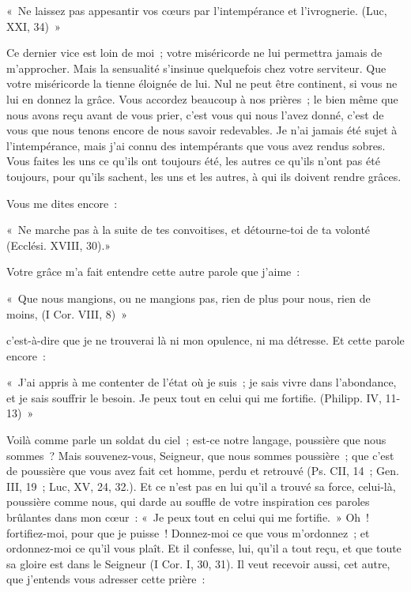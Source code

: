 \documentclass[french,twoside]{book} %
\newenvironment{quoteblock}%
  {\begin{quoting}}
  {\end{quoting}}
\newenvironment{quotebar}{%
    \def\FrameCommand{{\color{rubric!10!}\vrule width 0.5em} \hspace{0.9em}}%
    \def\OuterFrameSep{\itemsep} %
    \MakeFramed {\advance\hsize-\width \FrameRestore}
  }%
  {%
    \endMakeFramed
  }
\renewenvironment{quoteblock}%
  {%
    \savenotes
    \setstretch{0.9}
    \normalfont
    \begin{quotebar}
  }
  {%
    \end{quotebar}
    \spewnotes
  }
\begin{document}
\begin{quoteblock}
\noindent « Ne laissez pas appesantir vos cœurs par l’intempérance et l’ivrognerie. (Luc, XXI, 34) »\end{quoteblock}

\noindent Ce dernier vice est loin de moi ; votre miséricorde ne lui permettra jamais de m’approcher. Mais la sensualité s’insinue quelquefois chez votre serviteur. Que votre miséricorde la tienne éloignée de lui. Nul ne peut être continent, si vous ne lui en donnez la grâce. Vous accordez beaucoup à nos prières ; le bien même que nous avons reçu avant de vous prier, c’est vous qui nous l’avez donné, c’est de vous que nous tenons encore de nous savoir redevables. Je n’ai jamais été sujet à l’intempérance, mais j’ai connu des intempérants que vous avez rendus sobres. Vous faites les uns ce qu’ils ont toujours été, les autres ce qu’ils n’ont pas été toujours, pour qu’ils sachent, les uns et les autres, à qui ils doivent rendre grâces.\par
Vous me dites encore :\par

\begin{quoteblock}
\noindent « Ne marche pas à la suite de tes convoitises, et détourne-toi de ta volonté (Ecclési. XVIII, 30).»\end{quoteblock}

\noindent Votre grâce m’a fait entendre cette autre parole que j’aime :\par

\begin{quoteblock}
\noindent « Que nous mangions, ou ne mangions pas, rien de plus pour nous, rien de moins, (I Cor. VIII, 8) »\end{quoteblock}

\noindent c’est-à-dire que je ne trouverai là ni mon opulence, ni ma détresse. Et cette parole encore :\par

\begin{quoteblock}
\noindent « J’ai appris à me contenter de l’état où je suis ; je sais vivre dans l’abondance, et je sais souffrir le besoin. Je peux tout en celui qui me fortifie. (Philipp. IV, 11-13) »\end{quoteblock}

\noindent Voilà comme parle un soldat du ciel ; est-ce notre langage, poussière que nous sommes ? Mais souvenez-vous, Seigneur, que nous sommes poussière ; que c’est de poussière que vous avez fait cet homme, perdu et retrouvé (Ps. CII, 14 ; Gen. III, 19 ; Luc, XV, 24, 32.). Et ce n’est pas en lui qu’il a trouvé sa force, celui-là, poussière comme nous, qui darde au souffle de votre inspiration ces paroles brûlantes dans mon cœur : « Je peux tout en celui qui me fortifie. » Oh ! fortifiez-moi, pour que je puisse ! Donnez-moi ce que vous m’ordonnez ; et ordonnez-moi ce qu’il vous plaît. Et il confesse, lui, qu’il a tout reçu, et que toute sa gloire est dans le Seigneur (I Cor. I, 30, 31). Il veut recevoir aussi, cet autre, que j’entends vous adresser cette prière :\par
\end{document}
